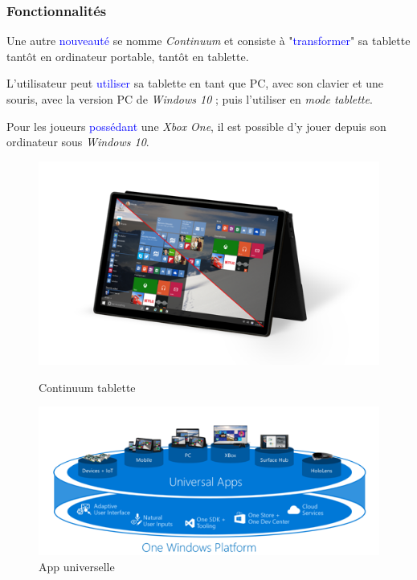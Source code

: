 \documentclass[aspectratio=169]{beamer}
\begin{document}
\begin{frame}
  \frametitle{Fonctionnalités}
  Une autre \textcolor{blue}{nouveauté} se nomme \textit{Continuum} et consiste
  à "\textcolor{blue}{transformer}" sa tablette tantôt en ordinateur portable,
  tantôt en tablette.

  \hspace{0.5cm}

  L'utilisateur peut \textcolor{blue}{utiliser} sa tablette en tant que PC,
  avec son clavier et une souris, avec la version PC de \textit{Windows 10} ; puis
  l'utiliser en \textit{mode tablette}.

  \hspace{0.5cm}

  Pour les joueurs \textcolor{blue}{possédant} une \textit{Xbox One}, il est possible
  d'y jouer depuis son ordinateur sous \textit{Windows 10}.

  \begin{figure}[!htb] 
  \includegraphics[width=\linewidth]
  {textures/images/windows/features/Continuum_tablet.png}
  \caption{Continuum tablette}\label{fig: Continuum}
	\endminipage\hfill {}
  \includegraphics[width=\linewidth]{textures/images/windows/features/Universal_App.png}
  \caption{App universelle}\label{fig:App universelle}
	\endminipage
\end{figure}
  \end{frame}
\end{document}
